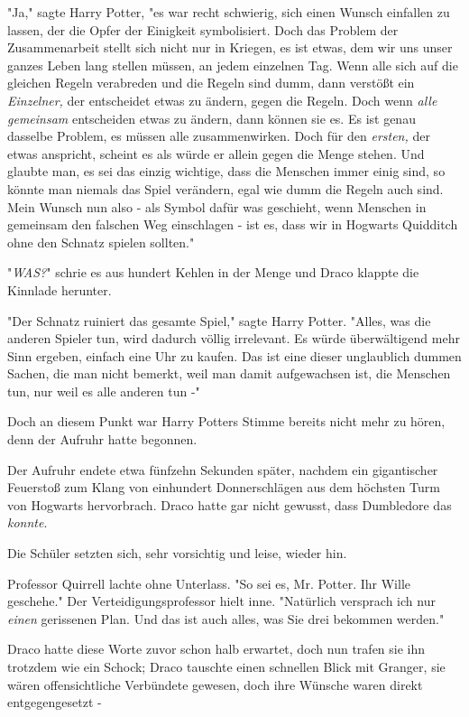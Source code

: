 {"Ja," sagte Harry Potter, "es war recht schwierig, sich einen Wunsch einfallen zu lassen, der die Opfer der Einigkeit symbolisiert. Doch das Problem der Zusammenarbeit stellt sich nicht nur in Kriegen, es ist etwas, dem wir uns unser ganzes Leben lang stellen müssen, an jedem einzelnen Tag. Wenn alle sich auf die gleichen Regeln verabreden und die Regeln sind dumm, dann verstößt ein \emph{Einzelner,} der entscheidet etwas zu ändern, gegen die Regeln. Doch wenn \emph{alle gemeinsam} entscheiden etwas zu ändern, dann können sie es. Es ist genau dasselbe Problem, es müssen alle zusammenwirken. Doch für den \emph{ersten,} der etwas anspricht, scheint es als würde er allein gegen die Menge stehen. Und glaubte man, es sei das einzig wichtige, dass die Menschen immer einig sind, so könnte man niemals das Spiel verändern, egal wie dumm die Regeln auch sind. Mein Wunsch nun also - als Symbol dafür was geschieht, wenn Menschen in gemeinsam den falschen Weg einschlagen - ist es, dass wir in Hogwarts Quidditch ohne den Schnatz spielen sollten."

"\emph{WAS?}" schrie es aus hundert Kehlen in der Menge und Draco klappte die Kinnlade herunter.

"Der Schnatz ruiniert das gesamte Spiel," sagte Harry Potter. "Alles, was die anderen Spieler tun, wird dadurch völlig irrelevant. Es würde überwältigend mehr Sinn ergeben, einfach eine Uhr zu kaufen. Das ist eine dieser unglaublich dummen Sachen, die man nicht bemerkt, weil man damit aufgewachsen ist, die Menschen tun, nur weil es alle anderen tun -"

Doch an diesem Punkt war Harry Potters Stimme bereits nicht mehr zu hören, denn der Aufruhr hatte begonnen.

\later

Der Aufruhr endete etwa fünfzehn Sekunden später, nachdem ein gigantischer Feuerstoß zum Klang von einhundert Donnerschlägen aus dem höchsten Turm von Hogwarts hervorbrach. Draco hatte gar nicht gewusst, dass Dumbledore das \emph{konnte}.

Die Schüler setzten sich, sehr vorsichtig und leise, wieder hin.

Professor Quirrell lachte ohne Unterlass. "So sei es, Mr. Potter. Ihr Wille geschehe." Der Verteidigungsprofessor hielt inne. "Natürlich versprach ich nur \emph{einen} gerissenen Plan. Und das ist auch alles, was Sie drei bekommen werden."

Draco hatte diese Worte zuvor schon halb erwartet, doch nun trafen sie ihn trotzdem wie ein Schock; Draco tauschte einen schnellen Blick mit Granger, sie wären offensichtliche Verbündete gewesen, doch ihre Wünsche waren direkt entgegengesetzt -

}
